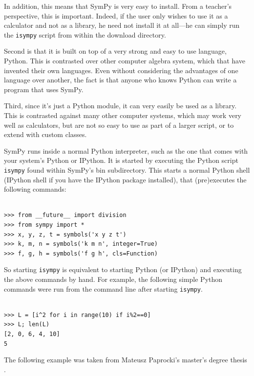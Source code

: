 \documentclass[12pt]{article}
\begin{document}
In addition, this means that SymPy is very easy to install.  From a
teacher's perspective, this is important. Indeed, if the user only
wishes to use it as a calculator and not as a library, he need not
install it at all---he can simply run the {\tt isympy} script from
within the download directory.

Second is that it is built on top of a very strong and easy to use
language, Python.  This is contrasted over other
computer algebra system, which that have invented their
own languages.  Even without considering the advantages of one language
over another, the fact is that anyone who knows Python can write a program
that uses SymPy.

Third, since it's just a Python module, it can very
easily be used as a library.  This is contrasted against many
other computer systems, which may work very well as calculators, but are not
so easy to use as part of a larger script, or to extend with custom classes.

SymPy runs inside a normal Python interpreter, such as the one that
comes with your system's Python or IPython.
It is started by executing the Python script {\tt isympy}
found within SymPy's bin subdirectory.
This starts a normal Python shell (IPython shell if you have the
IPython package installed),  that (pre)executes the following commands:

\begin{Verbatim}[fontsize=\scriptsize,fontfamily=courier,fontshape=tt,frame=single,label=Python]

>>> from __future__ import division
>>> from sympy import *
>>> x, y, z, t = symbols('x y z t')
>>> k, m, n = symbols('k m n', integer=True)
>>> f, g, h = symbols('f g h', cls=Function)

\end{Verbatim}
So starting {\tt isympy} is equivalent to starting Python (or IPython)
and executing the above commands by hand.
For example, the following simple Python commands were run
from the command line after starting {\tt isympy}.

\begin{Verbatim}[fontsize=\scriptsize,fontfamily=courier,fontshape=tt,frame=single,label=SymPy]

>>> L = [i^2 for i in range(10) if i%2==0]
>>> L; len(L)
[2, 0, 6, 4, 10]
5

\end{Verbatim}

The following example was taken from Mateusz Paprocki's master's
degree thesis \cite{P}.
\end{document}
